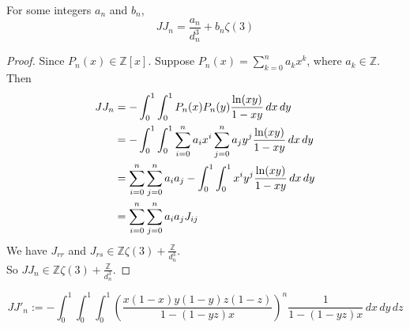 \begin{lemma}\label{J_n_integers_an_bn}
    For some integers $a_n$ and $b_n$,
    \[ JJ_n = \frac{a_n}{d_n^3} + b_n\zeta(3) \]
\end{lemma}
\begin{proof}
    \leanok
    Since $P_n(x) \in \mathbb{Z}[x]$. Suppose $P_n(x) = \sum\limits_{k=0}^{n}a_kx^k$, where $a_k \in \mathbb{Z}$.\\
    Then 
    \begin{align*}
        JJ_n &= -\int_{0}^{1}\int_{0}^{1} P_n(x)P_n(y)\frac{{\rm ln}(xy)}{1-xy} \, dx \, dy \\
        &= -\int_{0}^{1}\int_{0}^{1} \sum\limits_{i=0}^{n}a_ix^i \sum\limits_{j=0}^{n}a_jy^j \frac{{\rm ln}(xy)}{1-xy} \, dx \, dy\\
        &= \sum\limits_{i=0}^{n}\sum\limits_{j=0}^{n}a_i a_j -\int_{0}^{1}\int_{0}^{1} x^i y^j \frac{{\rm ln}(xy)}{1-xy} \, dx \, dy\\
        &= \sum\limits_{i=0}^{n}\sum\limits_{j=0}^{n}a_i a_j J_{ij}\\
    \end{align*}
    We have $J_{rr}$ and $J_{rs} \in \mathbb{Z}\zeta(3) + \frac{\mathbb{Z}}{d_n^3}$.\\
    So $JJ_n \in \mathbb{Z}\zeta(3) + \frac{\mathbb{Z}}{d_n^3}$.
\end{proof}


\begin{definition}\label{JJ'_n}
    \leanok
    \[ JJ'_n := - \int_{0}^{1}\int_{0}^{1}\int_{0}^{1} (\frac{x(1-x)y(1-y)z(1-z)}{1-(1-yz)x})^n \frac{1}{1-(1-yz)x} \, dx \, dy \, dz \]
\end{definition}

